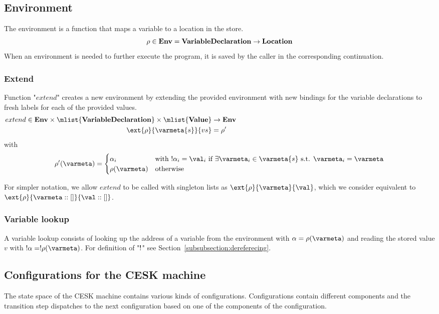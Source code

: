\documentclass{article}
\begin{document}
\subsection{Environment}
\label{subsec:env-definition}
The environment is a function that maps a variable to a location in the store.
\[\rho \in \mathbf{Env} = \mathbf{VariableDeclaration} \rightarrow \mathbf{Location}\]
When an environment is needed to further execute the program, it is saved by the caller in the corresponding continuation.

\subsubsection{Extend}
\label{subsubsec:extend-env}

Function "$extend$" creates a new environment by extending the provided environment with new bindings for the variable declarations to fresh labels for each of the provided values.
\begin{align*}
  extend \in \denv \times \mlist{\dvardecl} \times \mlist{\dval} &\rightarrow  \denv \hspace{100mm} \\
  \ext{\env}{\varmeta{s}}{\vals} &= \env'
\end{align*}
with 
\[
	\env'(\varmeta) =\begin{cases}
	\loc_i & \textrm{with }\deref{\loc_i} = \val_i\textrm{ if }\exists\varmeta_i \in \varmeta{s} \textrm{ s.t. } \varmeta_i = \varmeta\\
	\env(\varmeta) &\textrm{otherwise}
	\end{cases}
\]

For simpler notation, we allow $extend$ to be called with singleton lists as $\ext{\env}{\varmeta}{\val}$, which we consider equivalent to $\ext{\env}{\varmeta :: []}{\val :: []}$.
\subsubsection{Variable lookup}
\label{subsubsec:variable-lookup}
A variable lookup consists of looking up the address of a variable from the environment with $\loc = \env(\varmeta)$ and reading the stored value $v$ with $\deref{\loc} = \deref{\env(\varmeta)}$. For definition of "$!$" see Section~\ref{subsubsection:dereferecing}.

\subsection{Configurations for the CESK machine}
\label{subsec:cesk-configs}
The state space of the CESK machine contains various kinds of configurations. Configurations contain different components and the transition step dispatches to the next configuration based on one of the components of the configuration.
\end{document}
